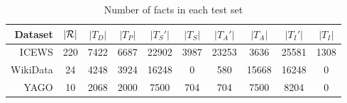 \begin{table}[htb]
\centering
\begin{minipage}{\columnwidthcaption}
\centering
\caption{Number of facts in each test set}
\label{tab:test_set_stats}
\end{minipage}
\vspace{-3mm}

\begin{tabular}{r|c|cc|cc|cc|cc}\hline
Dataset & $|\mathcal{R}|$ & $|T_D|$ & $|T_P|$  & $|T_S'|$ & $|T_S|$ & $|T_A'|$ & $|T_A|$ & $|T_I'|$ & $|T_I|$
\\ \hline
ICEWS & 220 & 7422 & 6687 & 22902 & 3987 & 23253 & 3636 & 25581 & 1308
\\
WikiData & 24 & 4248 & 3924 & 16248 & 0 & 580 & 15668 & 16248 & 0 
\\
YAGO & 10 & 2068 & 2000 & 7500 & 704 & 704 & 7500 & 8204 & 0 
\\
 \hline
\end{tabular}

\end{table}

